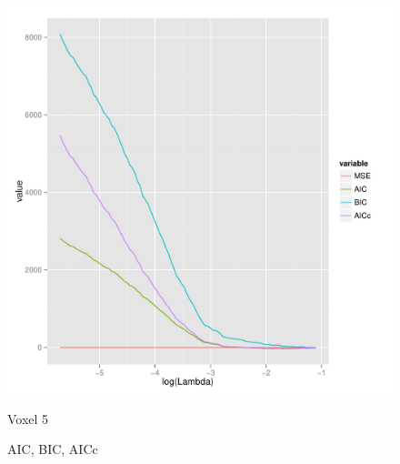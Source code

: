\documentclass[english]{amsart}
\begin{document}
\begin{figure}[H]
  \includegraphics[width=\linewidth]{Voxel_5_AIC.pdf}
  \caption{Voxel 5}
\endminipage
\caption{AIC, BIC, AICc}

\end{figure}
\vspace{-20mm}
\end{document}
